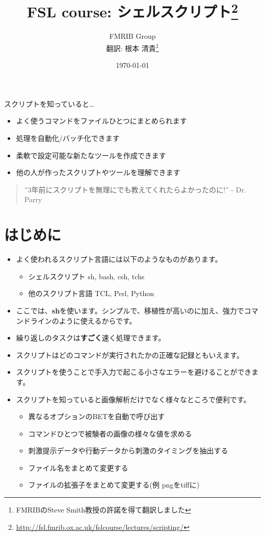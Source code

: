 \documentclass{jsarticle}
\begin{document}
\title{FSL course: シェルスクリプト\thanks{\url{http://fsl.fmrib.ox.ac.uk/fslcourse/lectures/scripting/}}} 
\author{FMRIB Group \\ 翻訳: 根本 清貴\thanks{FMRIBのSteve Smith教授の許諾を得て翻訳しました}}
\date{\today}
\maketitle
\thispagestyle{empty}

スクリプトを知っていると…
\begin{itemize}
\item よく使うコマンドをファイルひとつにまとめられます
\item 処理を自動化/バッチ化できます
\item 柔軟で設定可能な新たなツールを作成できます
\item 他の人が作ったスクリプトやツールを理解できます
\end{itemize}

\begin{quote}
{\color{blue} ''3年前にスクリプトを無理にでも教えてくれたらよかったのに!'' - Dr. Parry}
\end{quote}

\tableofcontents

\section{はじめに}

\begin{itemize}
\item よく使われるスクリプト言語には以下のようなものがあります。
	\begin{itemize}
	\item シェルスクリプト sh, bash, csh, tchs
	\item 他のスクリプト言語 TCL, Perl, Python
	\end{itemize}
\item ここでは、{\bf sh}を使います。シンプルで、移植性が高いのに加え、強力でコマンドラインのように使えるからです。
\item 繰り返しのタスクは{\bf すごく}速く処理できます。
\item スクリプトはどのコマンドが実行されたかの正確な記録ともいえます。
\item スクリプトを使うことで手入力で起こる小さなエラーを避けることができます。
\item スクリプトを知っていると画像解析だけでなく様々なところで便利です。
	\begin{itemize}
	\item 異なるオプションのBETを自動で呼び出す
	\item コマンドひとつで被験者の画像の様々な値を求める
	\item 刺激提示データや行動データから刺激のタイミングを抽出する
	\item ファイル名をまとめて変更する
	\item ファイルの拡張子をまとめて変更する(例 pngをtiffに)
	\end{itemize}
\end{itemize}
\end{document}
